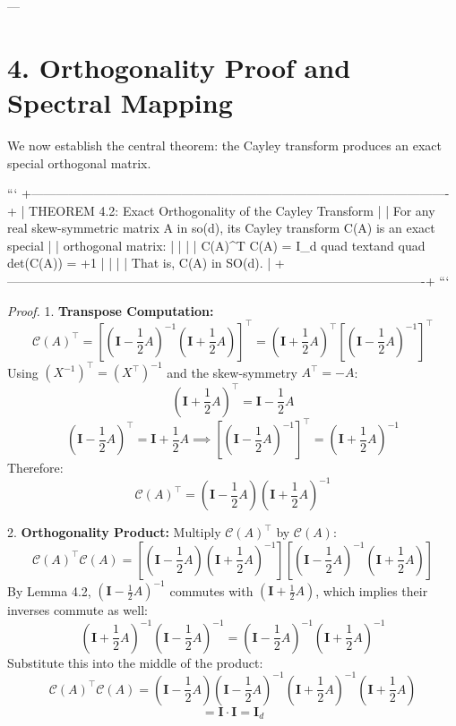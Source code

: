 \documentclass[11pt,twoside,openright]{amsbook}
\begin{document}
{{{{{{---

\section{4. Orthogonality Proof and Spectral Mapping}

We now establish the central theorem: the Cayley transform produces an exact special orthogonal matrix.

```
+----------------------------------------------------------------------------------------------------+
| THEOREM 4.2: Exact Orthogonality of the Cayley Transform                                           |
| For any real skew-symmetric matrix A in so(d), its Cayley transform C(A) is an exact special       |
| orthogonal matrix:                                                                                 |
|                                                                                                    |
|   C(A)^T C(A) = I_d  quad text{and} quad det(C(A)) = +1                                            |
|                                                                                                    |
| That is, C(A) in SO(d).                                                                            |
+----------------------------------------------------------------------------------------------------+
```

\textit{Proof.}
1. \textbf{Transpose Computation:}  
   $$\mathcal{C}(A)^\top = \left[ \left(\mathbf{I} - \frac{1}{2} A\right)^{-1} \left(\mathbf{I} + \frac{1}{2} A\right) \right]^\top = \left(\mathbf{I} + \frac{1}{2} A\right)^\top \left[ \left(\mathbf{I} - \frac{1}{2} A\right)^{-1} \right]^\top$$
   Using $(X^{-1})^\top = (X^\top)^{-1}$ and the skew-symmetry $A^\top = -A$:
   $$\left(\mathbf{I} + \frac{1}{2} A\right)^\top = \mathbf{I} - \frac{1}{2} A$$
   $$\left(\mathbf{I} - \frac{1}{2} A\right)^\top = \mathbf{I} + \frac{1}{2} A \implies \left[ \left(\mathbf{I} - \frac{1}{2} A\right)^{-1} \right]^\top = \left(\mathbf{I} + \frac{1}{2} A\right)^{-1}$$
   Therefore:
   $$\mathcal{C}(A)^\top = \left(\mathbf{I} - \frac{1}{2} A\right) \left(\mathbf{I} + \frac{1}{2} A\right)^{-1}$$

2. \textbf{Orthogonality Product:}  
   Multiply $\mathcal{C}(A)^\top$ by $\mathcal{C}(A)$:
   $$\mathcal{C}(A)^\top \mathcal{C}(A) = \left[ \left(\mathbf{I} - \frac{1}{2} A\right) \left(\mathbf{I} + \frac{1}{2} A\right)^{-1} \right] \left[ \left(\mathbf{I} - \frac{1}{2} A\right)^{-1} \left(\mathbf{I} + \frac{1}{2} A\right) \right]$$
   By Lemma 4.2, $(\mathbf{I} - \frac{1}{2} A)^{-1}$ commutes with $(\mathbf{I} + \frac{1}{2} A)$, which implies their inverses commute as well:
   $$\left(\mathbf{I} + \frac{1}{2} A\right)^{-1} \left(\mathbf{I} - \frac{1}{2} A\right)^{-1} = \left(\mathbf{I} - \frac{1}{2} A\right)^{-1} \left(\mathbf{I} + \frac{1}{2} A\right)^{-1}$$
   Substitute this into the middle of the product:
   $$\mathcal{C}(A)^\top \mathcal{C}(A) = \left(\mathbf{I} - \frac{1}{2} A\right) \left(\mathbf{I} - \frac{1}{2} A\right)^{-1} \left(\mathbf{I} + \frac{1}{2} A\right)^{-1} \left(\mathbf{I} + \frac{1}{2} A\right)$$
   $$= \mathbf{I} \cdot \mathbf{I} = \mathbf{I}_d$$

}}}}}}
\end{document}
